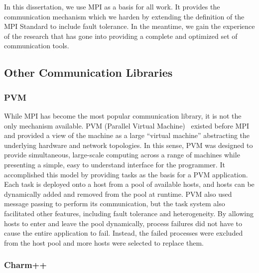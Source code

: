 In this dissertation, we use MPI as a basis for all work. It provides the communication
mechanism which we harden by extending the definition of the MPI Standard to
include fault tolerance. In the meantime, we gain the experience of the research that has gone into providing a complete and optimized set of communication tools.

\subsection{Other Communication Libraries}
\label{sec:background:mpi:other}

\subsubsection{PVM}

While MPI has become the most popular communication library, it is not the only
mechanism available. PVM (Parallel Virtual Machine)~\cite{Sunderam:1990tk} existed before
MPI and provided a view of the machine as a large ``virtual machine''
abstracting the underlying hardware and network topologies. In this sense, PVM
was designed to provide simultaneous, large-scale computing across a range of
machines while presenting a simple, easy to understand interface for the
programmer. It accomplished this model by providing tasks as the basis for a PVM
application. Each task is deployed onto a host from a pool of available hosts, and hosts can
be dynamically added and removed from the pool at runtime. PVM also used message
passing to perform its communication, but the task system also facilitated other
features, including fault tolerance and heterogeneity. By allowing hosts to
enter and leave the pool dynamically, process failures did not have to cause the entire 
application to fail. Instead, the failed processes were excluded from the host pool and 
more hosts were selected to replace them.

\subsubsection{Charm++}

